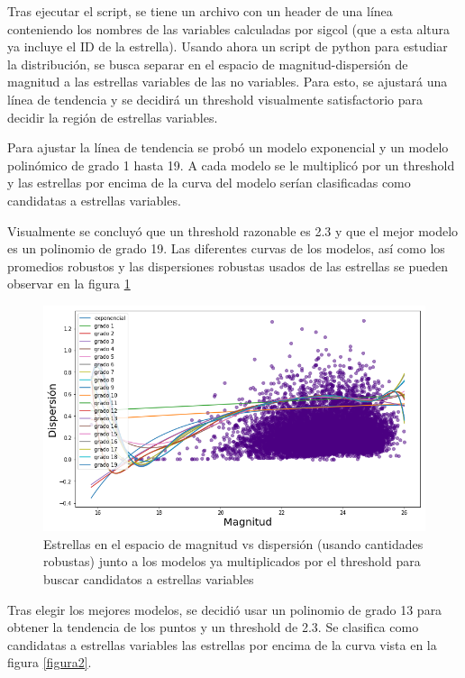 \documentclass[12pt]{article}
\begin{document}
Tras ejecutar el script, se tiene un archivo  con un header de una línea conteniendo los nombres de las variables calculadas por sigcol (que a esta altura ya incluye el ID de la estrella). 
Usando ahora un script de python para estudiar la distribución, se busca separar en el espacio de magnitud-dispersión de magnitud a las estrellas variables de las no variables. Para esto, se ajustará una línea de tendencia y se decidirá un threshold visualmente satisfactorio para decidir la región de estrellas variables.

Para ajustar la línea de tendencia se probó un modelo exponencial y un modelo polinómico de grado 1 hasta 19. A cada modelo se le multiplicó por un threshold y las estrellas por encima de la curva del modelo serían clasificadas como candidatas a estrellas variables.

Visualmente se concluyó que un threshold razonable es 2.3 y que el mejor modelo es un polinomio de grado 19. Las diferentes curvas de los modelos, así como los promedios robustos y las dispersiones robustas usados de las estrellas se pueden observar en la figura \ref{figura}


\begin{figure}[H]
  \centering
   \includegraphics[scale = 0.6]{fits.png}
  \caption{Estrellas en el espacio de magnitud vs dispersión (usando cantidades robustas) junto a los modelos ya multiplicados por el threshold para buscar candidatos a estrellas variables }
  \label{figura}
\end{figure}

Tras elegir los mejores modelos, se decidió usar un polinomio de grado 13 para obtener la tendencia de los puntos y un threshold de 2.3. Se clasifica como candidatas a estrellas variables las estrellas por encima de la curva vista en la figura \ref{figura2}.
\end{document}
